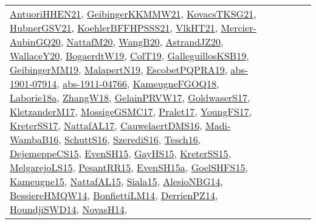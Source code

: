 {\begin{longtable}{llp{6cm}p{6cm}p{6cm}}
\href{papers/AntuoriHHEN21.pdf}{AntuoriHHEN21}\cite{AntuoriHHEN21}, \href{papers/GeibingerKKMMW21.pdf}{GeibingerKKMMW21}\cite{GeibingerKKMMW21}, \href{papers/KovacsTKSG21.pdf}{KovacsTKSG21}\cite{KovacsTKSG21}, \href{articles/HubnerGSV21.pdf}{HubnerGSV21}\cite{HubnerGSV21}, \href{articles/KoehlerBFFHPSSS21.pdf}{KoehlerBFFHPSSS21}\cite{KoehlerBFFHPSSS21}, \href{articles/VlkHT21.pdf}{VlkHT21}\cite{VlkHT21}, \href{papers/Mercier-AubinGQ20.pdf}{Mercier-AubinGQ20}\cite{Mercier-AubinGQ20}, \href{papers/NattafM20.pdf}{NattafM20}\cite{NattafM20}, \href{papers/WangB20.pdf}{WangB20}\cite{WangB20}, \href{articles/AstrandJZ20.pdf}{AstrandJZ20}\cite{AstrandJZ20}, \href{articles/WallaceY20.pdf}{WallaceY20}\cite{WallaceY20}, \href{papers/BogaerdtW19.pdf}{BogaerdtW19}\cite{BogaerdtW19}, \href{papers/ColT19.pdf}{ColT19}\cite{ColT19}, \href{papers/GalleguillosKSB19.pdf}{GalleguillosKSB19}\cite{GalleguillosKSB19}, \href{papers/GeibingerMM19.pdf}{GeibingerMM19}\cite{GeibingerMM19}, \href{papers/MalapertN19.pdf}{MalapertN19}\cite{MalapertN19}, \href{articles/EscobetPQPRA19.pdf}{EscobetPQPRA19}\cite{EscobetPQPRA19}, \href{articles/abs-1901-07914.pdf}{abs-1901-07914}\cite{abs-1901-07914}, \href{articles/abs-1911-04766.pdf}{abs-1911-04766}\cite{abs-1911-04766}, \href{papers/KameugneFGOQ18.pdf}{KameugneFGOQ18}\cite{KameugneFGOQ18}, \href{papers/Laborie18a.pdf}{Laborie18a}\cite{Laborie18a}, \href{articles/ZhangW18.pdf}{ZhangW18}\cite{ZhangW18}, \href{papers/GelainPRVW17.pdf}{GelainPRVW17}\cite{GelainPRVW17}, \href{papers/GoldwaserS17.pdf}{GoldwaserS17}\cite{GoldwaserS17}, \href{papers/KletzanderM17.pdf}{KletzanderM17}\cite{KletzanderM17}, \href{papers/MossigeGSMC17.pdf}{MossigeGSMC17}\cite{MossigeGSMC17}, \href{papers/Pralet17.pdf}{Pralet17}\cite{Pralet17}, \href{papers/YoungFS17.pdf}{YoungFS17}\cite{YoungFS17}, \href{articles/KreterSS17.pdf}{KreterSS17}\cite{KreterSS17}, \href{articles/NattafAL17.pdf}{NattafAL17}\cite{NattafAL17}, \href{papers/CauwelaertDMS16.pdf}{CauwelaertDMS16}\cite{CauwelaertDMS16}, \href{papers/Madi-WambaB16.pdf}{Madi-WambaB16}\cite{Madi-WambaB16}, \href{papers/SchuttS16.pdf}{SchuttS16}\cite{SchuttS16}, \href{papers/SzerediS16.pdf}{SzerediS16}\cite{SzerediS16}, \href{papers/Tesch16.pdf}{Tesch16}\cite{Tesch16}, \href{papers/DejemeppeCS15.pdf}{DejemeppeCS15}\cite{DejemeppeCS15}, \href{papers/EvenSH15.pdf}{EvenSH15}\cite{EvenSH15}, \href{papers/GayHS15.pdf}{GayHS15}\cite{GayHS15}, \href{papers/KreterSS15.pdf}{KreterSS15}\cite{KreterSS15}, \href{papers/MelgarejoLS15.pdf}{MelgarejoLS15}\cite{MelgarejoLS15}, \href{papers/PesantRR15.pdf}{PesantRR15}\cite{PesantRR15}, \href{articles/EvenSH15a.pdf}{EvenSH15a}\cite{EvenSH15a}, \href{articles/GoelSHFS15.pdf}{GoelSHFS15}\cite{GoelSHFS15}, \href{articles/Kameugne15.pdf}{Kameugne15}\cite{Kameugne15}, \href{articles/NattafAL15.pdf}{NattafAL15}\cite{NattafAL15}, \href{articles/Siala15.pdf}{Siala15}\cite{Siala15}, \href{papers/AlesioNBG14.pdf}{AlesioNBG14}\cite{AlesioNBG14}, \href{papers/BessiereHMQW14.pdf}{BessiereHMQW14}\cite{BessiereHMQW14}, \href{papers/BonfiettiLM14.pdf}{BonfiettiLM14}\cite{BonfiettiLM14}, \href{papers/DerrienPZ14.pdf}{DerrienPZ14}\cite{DerrienPZ14}, \href{papers/HoundjiSWD14.pdf}{HoundjiSWD14}\cite{HoundjiSWD14}, \href{articles/NovasH14.pdf}{NovasH14}\cite{NovasH14}, 
\end{longtable}}
